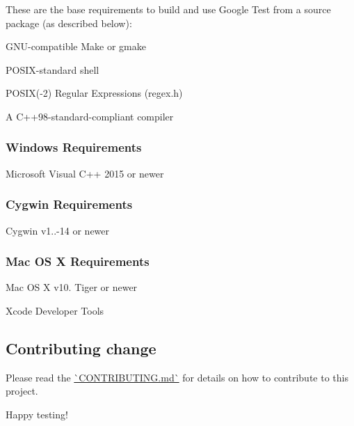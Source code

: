 These are the base requirements to build and use Google Test from a source package (as described below)\+:


\begin{DoxyItemize}
\item G\+N\+U-\/compatible Make or gmake
\item P\+O\+S\+I\+X-\/standard shell
\item P\+O\+S\+IX(-\/2) Regular Expressions (regex.\+h)
\item A C++98-\/standard-\/compliant compiler
\end{DoxyItemize}

\subsubsection*{Windows Requirements}


\begin{DoxyItemize}
\item Microsoft Visual C++ 2015 or newer
\end{DoxyItemize}

\subsubsection*{Cygwin Requirements}


\begin{DoxyItemize}
\item Cygwin v1..-\/14 or newer
\end{DoxyItemize}

\subsubsection*{Mac OS X Requirements}


\begin{DoxyItemize}
\item Mac OS X v10. Tiger or newer
\item Xcode Developer Tools
\end{DoxyItemize}

\subsection*{Contributing change}

Please read the \mbox{\hyperlink{_obj__test_2lib_2googletest-release-1_88_81_2_c_o_n_t_r_i_b_u_t_i_n_g_8md}{\`{}\+C\+O\+N\+T\+R\+I\+B\+U\+T\+I\+NG.md\`{}}} for details on how to contribute to this project.

Happy testing! 